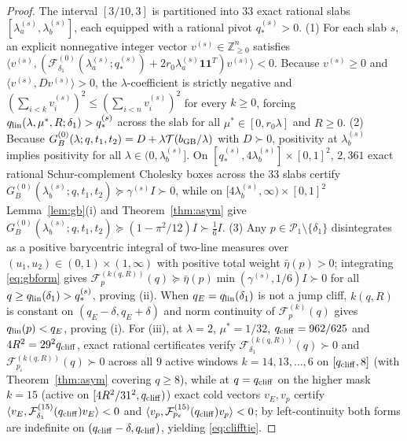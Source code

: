 \documentclass[11pt]{article}
\newcommand{\Fcal}{\mathcal F}
\newcommand{\muS}{\mu^{*}}
\theoremstyle{definition}
\theoremstyle{remark}
\begin{document}
\begin{proof}
The interval $[3/10,3]$ is partitioned into $33$ exact rational slabs
$[\lambda_a^{(s)},\lambda_b^{(s)}]$, each equipped with a rational pivot $q_*^{(s)}>0$.
(1) For each slab $s$, an explicit nonnegative integer vector $v^{(s)}\in\mathbb Z_{\ge0}^n$
satisfies $\langle v^{(s)},(\Fcal_{\delta_1}^{(0)}(\lambda_a^{(s)};q_*^{(s)})+2r_0\lambda_a^{(s)}\mathbf 1\mathbf 1^T)v^{(s)}\rangle<0$.
Because $v^{(s)}\ge0$ and $\langle v^{(s)},Dv^{(s)}\rangle>0$, the $\lambda$-coefficient is
strictly negative and $(\sum_{i<k}v_i^{(s)})^2\le(\sum_{i<n}v_i^{(s)})^2$ for every $k\ge0$,
forcing $q_{\rm lin}(\lambda,\muS,R;\delta_1)>q_*^{(s)}$ across the slab for all
$\muS\in[0,r_0\lambda]$ and $R\ge0$. (2) Because $G_B^{(0)}(\lambda;q,t_1,t_2)=D+\lambda\mathcal T(b_{\rm GB}/\lambda)$
with $D\succ0$, positivity at $\lambda_b^{(s)}$ implies positivity for all
$\lambda\in(0,\lambda_b^{(s)}]$. On $[q_*^{(s)},4\lambda_b^{(s)}]\times[0,1]^2$, $2{,}361$
exact rational Schur-complement Cholesky boxes across the $33$ slabs certify
$G_B^{(0)}(\lambda_b^{(s)};q,t_1,t_2)\succeq\gamma^{(s)}I\succ0$, while on
$[4\lambda_b^{(s)},\infty)\times[0,1]^2$ Lemma~\ref{lem:gb}(i) and Theorem~\ref{thm:asym}
give $G_B^{(0)}(\lambda_b^{(s)};q,t_1,t_2)\succeq(1-\pi^2/12)I\succ\frac16I$. (3) Any
$p\in\mathcal P_1\setminus\{\delta_1\}$ disintegrates as a positive barycentric integral of
two-line measures over $(u_1,u_2)\in(0,1)\times(1,\infty)$ with positive total weight
$\bar\eta(p)>0$; integrating \eqref{eq:gbform} gives
$\Fcal_p^{(k(q,R))}(q)\succeq\bar\eta(p)\min(\gamma^{(s)},1/6)I\succ0$ for all
$q\ge q_{\rm lin}(\delta_1)>q_*^{(s)}$, proving (ii). When $q_E=q_{\rm lin}(\delta_1)$ is
not a jump cliff, $k(q,R)$ is constant on $(q_E-\delta,q_E+\delta)$ and norm continuity of
$\Fcal_p^{(k)}(q)$ gives $q_{\rm lin}(p)<q_E$, proving (i). For (iii), at $\lambda=2$,
$\muS=1/32$, $q_{\rm cliff}=962/625$ and $4R^2=29^2q_{\rm cliff}$, exact rational
certificates verify $\Fcal_{\delta_1}^{(k(q,R))}(q)\succ0$ and
$\Fcal_{p_\varepsilon}^{(k(q,R))}(q)\succ0$ across all $9$ active windows
$k=14,13,\dots,6$ on $[q_{\rm cliff},8]$ (with Theorem~\ref{thm:asym} covering $q\ge8$),
while at $q=q_{\rm cliff}$ on the higher mask $k=15$ (active on $[4R^2/31^2,q_{\rm cliff})$)
exact cold vectors $v_E,v_p$ certify $\langle v_E,\Fcal_{\delta_1}^{(15)}(q_{\rm cliff})v_E\rangle<0$
and $\langle v_p,\Fcal_{p_\varepsilon}^{(15)}(q_{\rm cliff})v_p\rangle<0$; by left-continuity
both forms are indefinite on $(q_{\rm cliff}-\delta,q_{\rm cliff})$, yielding \eqref{eq:clifftie}.
\end{proof}
\end{document}
